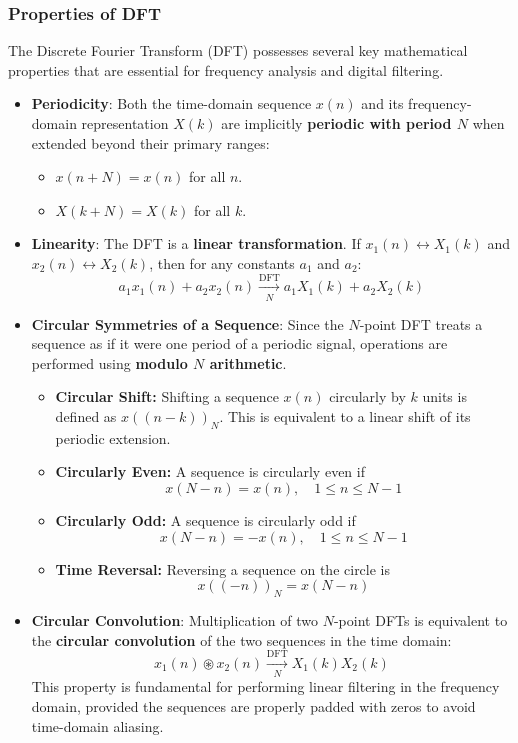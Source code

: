 \hypertarget{properties-of-dft}{%
\subsubsection{Properties of DFT}\label{properties-of-dft}}

The Discrete Fourier Transform (DFT) possesses several key mathematical
properties that are essential for frequency analysis and digital
filtering.

\begin{itemize}
\item
  \textbf{Periodicity}: Both the time-domain sequence \(x(n)\) and its
  frequency-domain representation \(X(k)\) are implicitly
  \textbf{periodic with period \(N\)} when extended beyond their primary
  ranges:

  \begin{itemize}
  \tightlist
  \item
    \(x(n+N) = x(n)\) for all \(n\).
  \item
    \(X(k+N) = X(k)\) for all \(k\).
  \end{itemize}
\item
  \textbf{Linearity}: The DFT is a \textbf{linear transformation}. If
  \(x_1(n) \leftrightarrow X_1(k)\) and
  \(x_2(n) \leftrightarrow X_2(k)\), then for any constants \(a_1\) and
  \(a_2\):
  \[a_1x_1(n) + a_2x_2(n) \xrightarrow[N]{\text{DFT}} a_1X_1(k) + a_2X_2(k)\]
\item
  \textbf{Circular Symmetries of a Sequence}: Since the \(N\)-point DFT
  treats a sequence as if it were one period of a periodic signal,
  operations are performed using \textbf{modulo \(N\) arithmetic}.

  \begin{itemize}
  \tightlist
  \item
    \textbf{Circular Shift:} Shifting a sequence \(x(n)\) circularly by
    \(k\) units is defined as \(x((n-k))_N\). This is equivalent to a
    linear shift of its periodic extension.
  \item
    \textbf{Circularly Even:} A sequence is circularly even if
    \[x(N-n) = x(n), \quad 1 \leq n \leq N-1\]
  \item
    \textbf{Circularly Odd:} A sequence is circularly odd if
    \[x(N-n) = -x(n), \quad 1 \leq n \leq N-1\]
  \item
    \textbf{Time Reversal:} Reversing a sequence on the circle is
    \[x(( -n ))_N = x(N-n)\]
  \end{itemize}
\item
  \textbf{Circular Convolution}: Multiplication of two \(N\)-point DFTs
  is equivalent to the \textbf{circular convolution} of the two
  sequences in the time domain:
  \[x_1(n) \circledast x_2(n) \xrightarrow[N]{\text{DFT}} X_1(k)X_2(k)\]
  This property is fundamental for performing linear filtering in the
  frequency domain, provided the sequences are properly padded with
  zeros to avoid time-domain aliasing.
\end{itemize}


